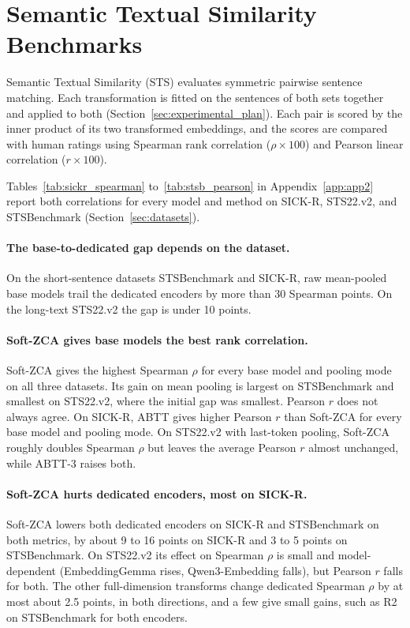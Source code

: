 \section{Semantic Textual Similarity Benchmarks}
\label{sec:similarity_results}

Semantic Textual Similarity (STS) evaluates symmetric pairwise sentence matching. Each transformation is fitted on the sentences of both sets together and applied to both (Section~\ref{sec:experimental_plan}). Each pair is scored by the inner product of its two transformed embeddings, and the scores are compared with human ratings using Spearman rank correlation ($\rho \times 100$) and Pearson linear correlation ($r \times 100$).

Tables~\ref{tab:sickr_spearman} to~\ref{tab:stsb_pearson} in Appendix~\ref{app:app2} report both correlations for every model and method on SICK-R, STS22.v2, and STSBenchmark (Section~\ref{sec:datasets}).

\paragraph{The base-to-dedicated gap depends on the dataset.}
On the short-sentence datasets STSBenchmark and SICK-R, raw mean-pooled base models trail the dedicated encoders by more than 30 Spearman points. On the long-text STS22.v2 the gap is under 10 points.

\paragraph{Soft-ZCA gives base models the best rank correlation.}
Soft-ZCA gives the highest Spearman $\rho$ for every base model and pooling mode on all three datasets. Its gain on mean pooling is largest on STSBenchmark and smallest on STS22.v2, where the initial gap was smallest. Pearson $r$ does not always agree. On SICK-R, ABTT gives higher Pearson $r$ than Soft-ZCA for every base model and pooling mode. On STS22.v2 with last-token pooling, Soft-ZCA roughly doubles Spearman $\rho$ but leaves the average Pearson $r$ almost unchanged, while ABTT-3 raises both.

\paragraph{Soft-ZCA hurts dedicated encoders, most on SICK-R.}
Soft-ZCA lowers both dedicated encoders on SICK-R and STSBenchmark on both metrics, by about 9 to 16 points on SICK-R and 3 to 5 points on STSBenchmark. On STS22.v2 its effect on Spearman $\rho$ is small and model-dependent (EmbeddingGemma rises, Qwen3-Embedding falls), but Pearson $r$ falls for both. The other full-dimension transforms change dedicated Spearman $\rho$ by at most about 2.5 points, in both directions, and a few give small gains, such as R2 on STSBenchmark for both encoders.

